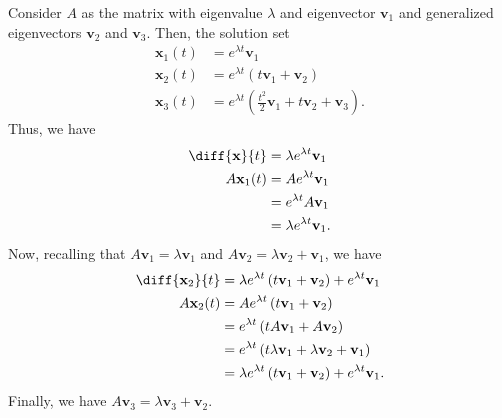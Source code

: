 \documentclass[10pt]{mypackage}
\begin{document}
\begin{example}
  Consider $A$ as the matrix with eigenvalue $\lambda$ and eigenvector $\mathbf{v}_1$ and generalized eigenvectors $\mathbf{v}_2$ and $\mathbf{v}_3$. Then, the solution set
  \begin{align*}
    \mathbf{x}_1(t) &= e^{\lambda t}\mathbf{v}_1\\
    \mathbf{x}_2(t) &= e^{\lambda t}\left( t\mathbf{v}_1 + \mathbf{v}_2 \right)\\
    \mathbf{x}_3(t) &= e^{\lambda t}\left( \frac{t^2}{2}\mathbf{v}_1 + t\mathbf{v}_2 + \mathbf{v}_3 \right).
  \end{align*}
  Thus, we have
  \begin{align*}
    \diff{\mathbf{x}}{t} &= \lambda e^{\lambda t} \mathbf{v}_1\\
    A\mathbf{x}_1(t) &= Ae^{\lambda t} \mathbf{v}_1\\
                     &= e^{\lambda t} A\mathbf{v}_1\\
                     &= \lambda e^{\lambda t}\mathbf{v}_1.
  \end{align*}
  Now, recalling that $A\mathbf{v}_1 = \lambda \mathbf{v}_1$ and $A\mathbf{v}_2 = \lambda \mathbf{v}_2 + \mathbf{v}_1$, we have
  \begin{align*}
    \diff{\mathbf{x}_2}{t} &= \lambda e^{\lambda t}\left( t\mathbf{v}_1 + \mathbf{v}_2 \right) + e^{\lambda t}\mathbf{v}_1\\
    A\mathbf{x}_2(t) &= Ae^{\lambda t}\left( t\mathbf{v}_1 + \mathbf{v}_2 \right)\\
                     &= e^{\lambda t}\left( tA\mathbf{v}_1 +  A\mathbf{v}_2\right)\\
                     &= e^{\lambda t}\left( t\lambda \mathbf{v}_1 + \lambda \mathbf{v}_2 + \mathbf{v}_1 \right)\\
                     &= \lambda e^{\lambda t}\left( t\mathbf{v}_1 + \mathbf{v}_2 \right) + e^{\lambda t}\mathbf{v}_1.
  \end{align*}
  Finally, we have $A\mathbf{v}_3 = \lambda \mathbf{v}_3 + \mathbf{v}_2 $.
\end{example}
\end{document}
